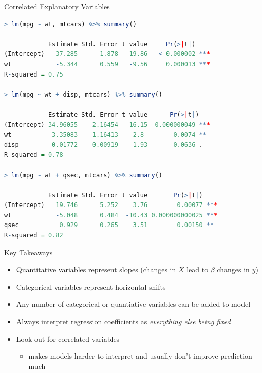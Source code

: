 \documentclass{beamer}
\begin{document}
\begin{frame}[fragile]{Correlated Explanatory Variables}


\begin{lstlisting}[language=R,basicstyle=\ttfamily\scriptsize]
> lm(mpg ~ wt, mtcars) %>% summary()

            Estimate Std. Error t value     Pr(>|t|)    
(Intercept)   37.285      1.878   19.86   < 0.000002 ***
wt            -5.344      0.559   -9.56     0.000013 ***
R-squared = 0.75

> lm(mpg ~ wt + disp, mtcars) %>% summary()

            Estimate Std. Error t value      Pr(>|t|)    
(Intercept) 34.96055    2.16454   16.15  0.000000049 ***
wt          -3.35083    1.16413   -2.8        0.0074 ** 
disp        -0.01772    0.00919   -1.93       0.0636 .  
R-squared = 0.78

> lm(mpg ~ wt + qsec, mtcars) %>% summary()

            Estimate Std. Error t value       Pr(>|t|)    
(Intercept)   19.746      5.252    3.76        0.00077 ***
wt            -5.048      0.484  -10.43 0.000000000025 ***
qsec           0.929      0.265    3.51        0.00150 ** 
R-squared = 0.82
\end{lstlisting}

\end{frame}




\begin{frame}{Key Takeaways}
\begin{itemize}
\item Quantitative variables represent slopes (changes in $X$ lead to $\beta$ changes in $y$)
\item Categorical variables represent horizontal shifts
\item Any number of categorical or quantiative variables can be added to model
\item Always interpret regression coefficients as \textit{everything else being fixed}
\item Look out for correlated variables
\begin{itemize}
    \item makes models harder to interpret and usually don't improve prediction much
\end{itemize}
\end{itemize}
\end{frame}

%
%
\end{document}
